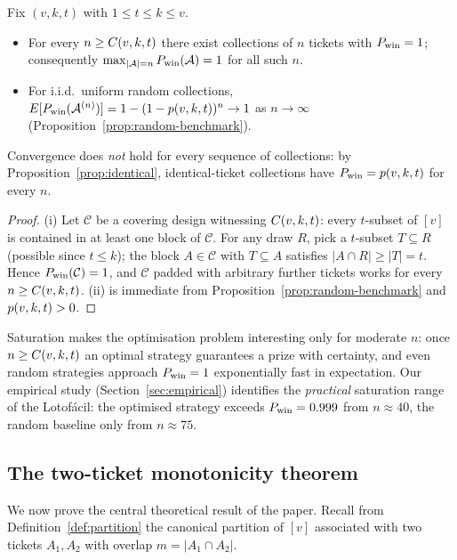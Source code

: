 \begin{proposition}
  \label{prop:saturation}
  Fix $(v,k,t)$ with $1 \le t \le k \le v$.
  \begin{itemize}
    \item[(i)] For every $n \ge C(v,k,t)$ there exist collections of $n$
      tickets with $P_{\mathrm{win}} = 1$; consequently
      $\max_{|\mathcal{A}| = n} P_{\mathrm{win}}(\mathcal{A}) = 1$ for all such $n$.
    \item[(ii)] For i.i.d.\ uniform random collections,
      $E[P_{\mathrm{win}}(\mathcal{A}^{(n)})] = 1 - (1-p(v,k,t))^n \to 1$ as
      $n \to \infty$ (Proposition~\ref{prop:random-benchmark}).
  \end{itemize}
  Convergence does \emph{not} hold for every sequence of collections: by
  Proposition~\ref{prop:identical}, identical-ticket collections have
  $P_{\mathrm{win}} = p(v,k,t)$ for every $n$.
\end{proposition}

\begin{proof}
  (i) Let $\mathcal{C}$ be a covering design witnessing $C(v,k,t)$: every
  $t$-subset of $[v]$ is contained in at least one block of $\mathcal{C}$.
  For any draw $R$, pick a $t$-subset $T \subseteq R$ (possible since
  $t \le k$); the block $A \in \mathcal{C}$ with $T \subseteq A$ satisfies
  $|A \cap R| \ge |T| = t$.  Hence $P_{\mathrm{win}}(\mathcal{C}) = 1$, and
  $\mathcal{C}$ padded with arbitrary further tickets works for every
  $n \ge C(v,k,t)$.  (ii) is immediate from
  Proposition~\ref{prop:random-benchmark} and $p(v,k,t) > 0$.
\end{proof}

\begin{remark}
  Saturation makes the optimisation problem interesting only for moderate
  $n$: once $n \ge C(v,k,t)$ an optimal strategy guarantees a prize with
  certainty, and even random strategies approach $P_{\mathrm{win}} = 1$ exponentially
  fast in expectation.  Our empirical study (Section~\ref{sec:empirical})
  identifies the \emph{practical} saturation range of the Lotofácil: the
  optimised strategy exceeds $P_{\mathrm{win}} = 0.999$ from $n \approx 40$, the
  random baseline only from $n \approx 75$.
\end{remark}

\subsection{The two-ticket monotonicity theorem}
\label{sec:two-ticket}

We now prove the central theoretical result of the paper.  Recall from
Definition~\ref{def:partition} the canonical partition of $[v]$ associated
with two tickets $A_1, A_2$ with overlap $m = |A_1 \cap A_2|$.


